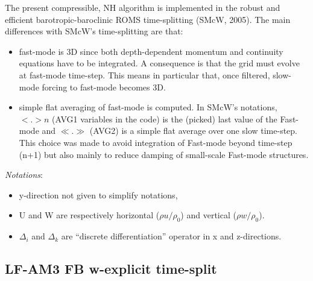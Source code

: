 \documentclass[a4paper,11pt]{article}
\begin{document}
  The present compressible, NH algorithm is implemented in the robust and efficient barotropic-baroclinic ROMS time-splitting (SMcW, 2005). The main differences with SMcW's time-splitting are that:
  \begin{itemize}
   \item fast-mode is 3D since both depth-dependent momentum and continuity equations have to be integrated. A consequence is that the grid must evolve at fast-mode time-step. This means in particular that, once filtered, slow-mode forcing to fast-mode becomes 3D.
   \item simple flat averaging of fast-mode is computed. In SMcW's notations, $<.>n$ (AVG1 variables in the code) is the (picked) last value of the Fast-mode and $\ll.\gg$ (AVG2) is a simple flat average over one slow time-step. This choice was made to avoid integration of Fast-mode beyond time-step (n+1) but also mainly to reduce damping of small-scale Fast-mode structures.\\
  \end{itemize}

   \textit{Notations}: 
  \begin{itemize}[label=\textbullet,font=\tiny]
   \item y-direction not given to simplify notations,
   \item U and W are respectively horizontal ($\rho u /\rho_0$) and vertical ($\rho w / \rho_0$).
   \item $\Delta_i$ and $\Delta_k$ are ``discrete differentiation'' operator in x and z-directions. 
  \end{itemize}
 \subsection{LF-AM3 FB w-explicit time-split}
 \label{Subsec-FB}
 
\end{document}
